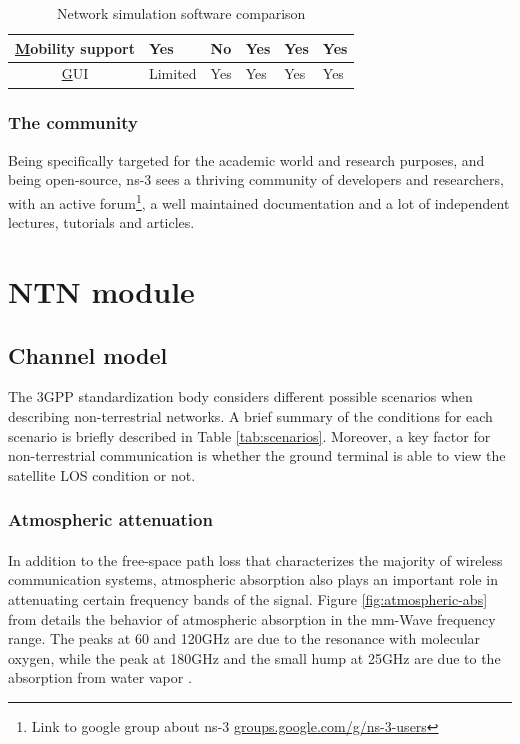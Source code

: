 \begin{table}[]
\begin{tabular}{|c|lllll}
            {\ul Mobility support} &
            Yes &
            No &
            Yes &
            Yes &
            Yes
            \\ \hline

            {\ul GUI} &
            Limited &
            Yes &
            Yes &
            Yes &
            Yes
            \\ \hline
    \end{tabular}
    \caption{Network simulation software comparison \label{tab:simulators}}
\end{table}

\subsubsection{The community}
Being specifically targeted for the academic world and research purposes, and being open-source, ns-3 sees a thriving community of developers and researchers, with an active forum\footnote{Link to google group about ns-3 \href{https://groups.google.com/g/ns-3-users}{groups.google.com/g/ns-3-users}}, a well maintained documentation and a lot of independent lectures, tutorials and articles. 


\section{NTN module}

\subsection{Channel model}
The \ac{3GPP} standardization body considers different possible scenarios when describing non-terrestrial networks. A brief summary of the conditions for each scenario is briefly described in Table \ref{tab:scenarios}. Moreover, a key factor for non-terrestrial communication is whether the ground terminal is able to view the satellite \ac{LOS} condition or not.

\subsubsection{Atmospheric attenuation}
\paragraph{}
In addition to the free-space path loss that characterizes the majority of wireless communication systems, atmospheric absorption also plays an important role in attenuating certain frequency bands of the signal. Figure \ref{fig:atmospheric-abs} from \cite{e-band-ammar} details the behavior of atmospheric absorption in the mm-Wave frequency range. The peaks at 60 and 120GHz are due to the resonance with molecular oxygen, while the peak at 180GHz and the small hump at 25GHz are due to the absorption from water vapor \cite{e-band-ammar}.


